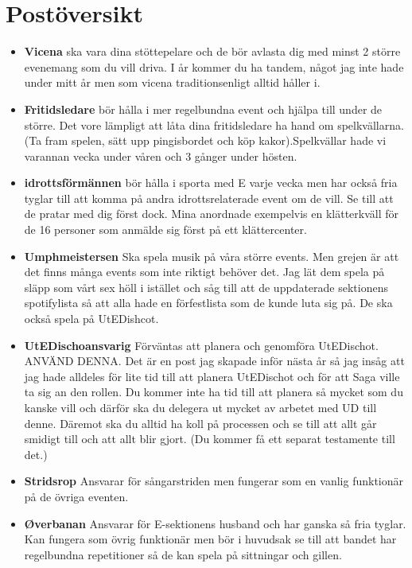 \documentclass[10pt]{article}
\begin{document}
    \section{Postöversikt}
    \begin{itemize}
        \item \textbf{Vicena} ska vara dina stöttepelare och de bör avlasta dig med minst 2 större evenemang som du vill driva. I år kommer du ha tandem, något jag inte hade under mitt år men som vicena traditionsenligt alltid håller i.
        \item \textbf{Fritidsledare} bör hålla i mer regelbundna event och hjälpa till under de större. Det vore lämpligt att låta dina fritidsledare ha hand om spelkvällarna. (Ta fram spelen, sätt upp pingisbordet och köp kakor).\newline Spelkvällar hade vi varannan vecka under våren och 3 gånger under hösten.
        \item \textbf{idrottsförmännen} bör hålla i sporta med E varje vecka men har också fria tyglar till att komma på andra idrottsrelaterade event om de vill. Se till att de pratar med dig först dock. Mina anordnade exempelvis en klätterkväll för de 16 personer som anmälde sig först på ett klättercenter.
        \item \textbf{Umphmeistersen} Ska spela musik på våra större events. Men grejen är att det finns många events som inte riktigt behöver det. Jag lät dem spela på släpp som vårt sex höll i istället och såg till att de uppdaterade sektionens spotifylista så att alla hade en förfestlista som de kunde luta sig på. De ska också spela på UtEDishcot.
        \item \textbf{UtEDischoansvarig} Förväntas att planera och genomföra UtEDischot. ANVÄND DENNA. Det är en post jag skapade inför nästa år så jag insåg att jag hade alldeles för lite tid till att planera UtEDischot och för att Saga ville ta sig an den rollen. Du kommer inte ha tid till att planera så mycket som du kanske vill och därför ska du delegera ut mycket av arbetet med UD till denne. Däremot ska du alltid ha koll på processen och se till att allt går smidigt till och att allt blir gjort. (Du kommer få ett separat testamente till det.)
        \item \textbf{Stridsrop} Ansvarar för sångarstriden men fungerar som en vanlig funktionär på de övriga eventen.
        \item \textbf{Øverbanan} Ansvarar för E-sektionens husband och har ganska så fria tyglar. Kan fungera som övrig funktionär men bör i huvudsak se till att bandet har regelbundna repetitioner så de kan spela på sittningar och gillen.
    \end{itemize}
\end{document}

